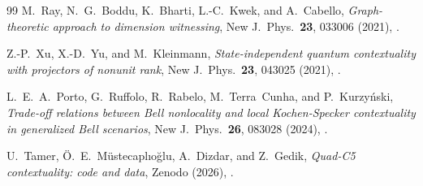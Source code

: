 \documentclass[aps,pra,twocolumn,superscriptaddress,longbibliography,floatfix]{revtex4-2}
\begin{document}
\begin{thebibliography}{99}
M.~Ray, N.~G.~Boddu, K.~Bharti, L.-C.~Kwek, and A.~Cabello,
\emph{Graph-theoretic approach to dimension witnessing},
New J.\ Phys.\ \textbf{23}, 033006 (2021),
.

Z.-P.~Xu, X.-D.~Yu, and M.~Kleinmann,
\emph{State-independent quantum contextuality with projectors of
nonunit rank},
New J.\ Phys.\ \textbf{23}, 043025 (2021),
.

L.~E.~A.~Porto, G.~Ruffolo, R.~Rabelo, M.~Terra~Cunha, and
P.~Kurzy\'nski,
\emph{Trade-off relations between Bell nonlocality and local
Kochen-Specker contextuality in generalized Bell scenarios},
New J.\ Phys.\ \textbf{26}, 083028 (2024),
.

U.~Tamer, \"{O}.~E.~M\"{u}stecapl\i{}o\u{g}lu, A.~Dizdar, and Z.~Gedik,
\emph{Quad-C5 contextuality: code and data},
Zenodo (2026),
.

\end{thebibliography}
\end{document}
